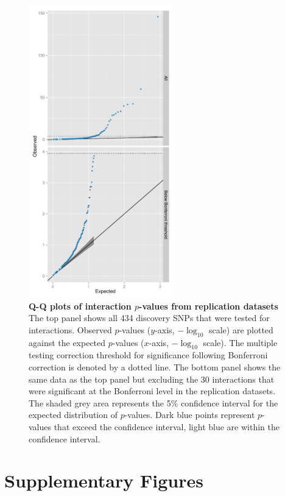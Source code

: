 \documentclass{article}
\begin{document}
\begin{figure}[H]
	\centering
	\includegraphics[width=2.5in]{qqMeta.pdf}
	\caption{\textbf{Q-Q plots of interaction $p$-values from replication datasets} The top panel shows all 434 discovery SNPs that were tested for interactions. Observed $p$-values ($y$-axis, $-\log_{10}$ scale) are plotted against the expected $p$-values ($x$-axis, $-\log_{10}$ scale). The multiple testing correction threshold for significance following Bonferroni correction is denoted by a dotted line. The bottom panel shows the same data as the top panel but excluding the 30 interactions that were significant at the Bonferroni level in the replication datasets. The shaded grey area represents the 5\% confidence interval for the expected distribution of $p$-values. Dark blue points represent $p$-values that exceed the confidence interval, light blue are within the confidence interval.}
	\label{fig:qqMeta}
\end{figure}
\clearpage


\clearpage
\section{Supplementary Figures}
\setcounter{figure}{0}
\makeatletter 
\renewcommand{\thefigure}{S\@arabic\c@figure} 
\makeatletter 
\end{document}

